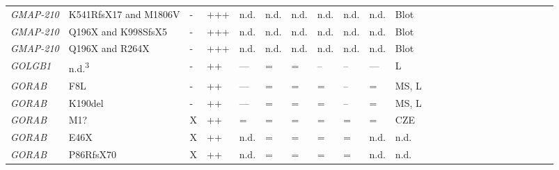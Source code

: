 \begin{landscape}
\begin{longtable}[c]{C{1.2cm}C{2cm}C{0.5cm}C{1.5cm}C{1.5cm}C{0.5cm}C{0.5cm}C{0.5cm}C{0.5cm}C{1.5cm}C{1.5cm}C{1.5cm}c c c c c c c c c c c c}
        \emph{GMAP-210} & K541RfsX17 and M1806V & -                       & +++                                      & n.d.                                 & n.d.   & n.d. & n.d.   & n.d.  & n.d.                                  & Blot                       & \cite{wehrle_hypomorphic_2019} \\
        \emph{GMAP-210} & Q196X and K998SfsX5 & -                       & +++                                      & n.d.                                & n.d.   & n.d. & n.d.   & n.d.  & n.d.                                  & Blot                       & \cite{wehrle_hypomorphic_2019} \\
        \emph{GMAP-210} & Q196X and R264X & -                       & +++                                      & n.d.                                 & n.d.   & n.d. & n.d.   & n.d.  & n.d.                                  & Blot                       & \cite{wehrle_hypomorphic_2019} \\
        \emph{GOLGB1} & n.d.\textsuperscript{3} & -                       & ++                                      & ---                                 & =   & = & --   & --  & ---                                  & L                       & \cite{lan_golgb1_2016} \\
        \emph{GORAB} & F8L & -                       & ++                                      & ---                                 & =   & = & =   & --  & =                                  & MS, L                       & \cite{witkos_gorab_2019} \\
        \emph{GORAB} & K190del & -                       & ++                                      & ---                                 & =   & = & =   & --  & =                                  & MS, L                       & \cite{witkos_gorab_2019} \\
        \emph{GORAB} & M1? & X                       & ++                                      & =                                & =   & = & =   & =  & =                                  & CZE                       & \cite{hennies_gerodermia_2008,rajab_geroderma_2008} \\
        \emph{GORAB} & E46X & X                       & ++                                      & n.d.                                & =   & = & =   & =  & n.d.                                  & n.d.                       & \cite{hennies_gerodermia_2008} \\
        \emph{GORAB} & P86RfsX70 & X                       & ++                                      & n.d.                                & =   & = & =   & =  & n.d.                                  & n.d.                       & \cite{hennies_gerodermia_2008} \\

\end{longtable}
\end{landscape}
